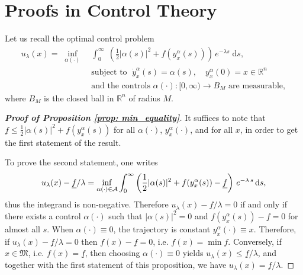 \documentclass[12pt]{amsart}
\newcommand{\D}[1]{\mbox{\rm #1}}
\newcommand{\dd}{\D{d}}
\numberwithin{equation}{section}
\theoremstyle{plain}
\begin{document}
\section{Proofs in Control Theory}\label{appendix: control}

Let us recall the optimal control problem
\begin{equation}\label{OCP appendix}
\begin{aligned}
    u_{\lambda}(x) = \; 
    \inf\limits_{\alpha(\cdot)} \; & \int_{0}^{\infty}\; \left(\frac{1}{2}|\alpha(s)|^{2} + f(y_{x}^{\alpha}(s))\right)\, e^{-\lambda s}\;\text{d}s,\\
    & \text{subject  to  }\; \dot{y}_{x}^{\alpha}(s) = \alpha(s),\quad y_{x}^{\alpha}(0)=x\in\mathbb{R}^n\\
    & \text{and the controls } \alpha(\cdot):[0,\infty) \to B_{M} \text{ are measurable}, 
\end{aligned}
\end{equation}
where $B_{M}$ is the closed ball in $\mathbb{R}^{n}$ of radius $M$.


\begin{proof}[\textbf{Proof of Proposition \ref{prop: min_equality}}]
It suffices to note that $\underline{f}\leq \frac{1}{2}|\alpha(s)|^{2} + f(y_{x}^{\alpha}(s))$ for all $\alpha(\cdot)$, $y_{x}^{\alpha}(\cdot)$, and for all $x$, in order to get the first statement of the result. 

To prove the second statement, one writes
\begin{equation*}
    u_{\lambda}(x) - \underline{f}/\lambda = \inf\limits_{\alpha(\cdot)\in \mathcal{A}} \int_{0}^{\infty}\left(\frac{1}{2}|\alpha(s)|^{2} + f(y_{x}^{\alpha}(s)) - \underline{f}\right)\,e^{-\lambda\,s}\,\dd s,
\end{equation*}
thus the integrand is non-negative. Therefore $u_{\lambda}(x) - \underline{f}/\lambda = 0$ if and only if there exists a control $\alpha(\cdot)$ such that $|\alpha(s)|^{2}=0$ and $ f(y_{x}^{\alpha}(s)) - \underline{f}=0$ for almost all $s$. When $\alpha(\cdot)\equiv 0$, the trajectory is constant $y_{x}^{\alpha}(\cdot)\equiv x$. Therefore, if $u_{\lambda}(x) - \underline{f}/\lambda = 0$ then $ f(x) - \underline{f}=0$, i.e. $f(x) = \min f$. Conversely, if $x\in \mathfrak{M}$, i.e. $ f(x) = \underline{f}$, then choosing $\alpha(\cdot)\equiv 0$ yields $u_{\lambda}(x) \leq \underline{f}/\lambda$, and together with the first statement of this proposition, we have $u_{\lambda}(x) =\underline{f}/\lambda$.
\end{proof}
\end{document}
